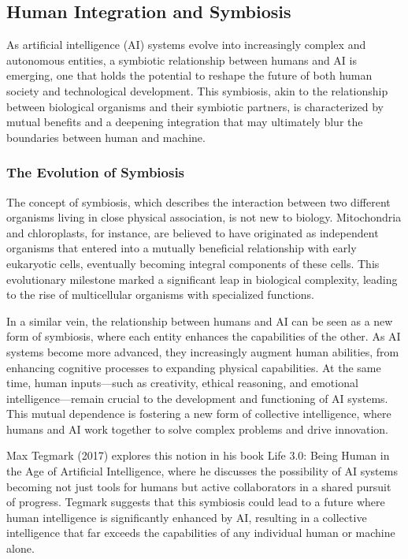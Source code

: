 \documentclass[12pt,twoside]{article}
\begin{document}
\subsection{Human Integration and Symbiosis}
As artificial intelligence (AI) systems evolve into increasingly complex and autonomous entities, a symbiotic relationship between humans and AI is emerging, one that holds the potential to reshape the future of both human society and technological development. This symbiosis, akin to the relationship between biological organisms and their symbiotic partners, is characterized by mutual benefits and a deepening integration that may ultimately blur the boundaries between human and machine.

\subsubsection{The Evolution of Symbiosis}

The concept of symbiosis, which describes the interaction between two different organisms living in close physical association, is not new to biology. Mitochondria and chloroplasts, for instance, are believed to have originated as independent organisms that entered into a mutually beneficial relationship with early eukaryotic cells, eventually becoming integral components of these cells. This evolutionary milestone marked a significant leap in biological complexity, leading to the rise of multicellular organisms with specialized functions.

In a similar vein, the relationship between humans and AI can be seen as a new form of symbiosis, where each entity enhances the capabilities of the other. As AI systems become more advanced, they increasingly augment human abilities, from enhancing cognitive processes to expanding physical capabilities. At the same time, human inputs—such as creativity, ethical reasoning, and emotional intelligence—remain crucial to the development and functioning of AI systems. This mutual dependence is fostering a new form of collective intelligence, where humans and AI work together to solve complex problems and drive innovation.

Max Tegmark (2017) explores this notion in his book Life 3.0: Being Human in the Age of Artificial Intelligence, where he discusses the possibility of AI systems becoming not just tools for humans but active collaborators in a shared pursuit of progress. Tegmark suggests that this symbiosis could lead to a future where human intelligence is significantly enhanced by AI, resulting in a collective intelligence that far exceeds the capabilities of any individual human or machine alone.
\end{document}

